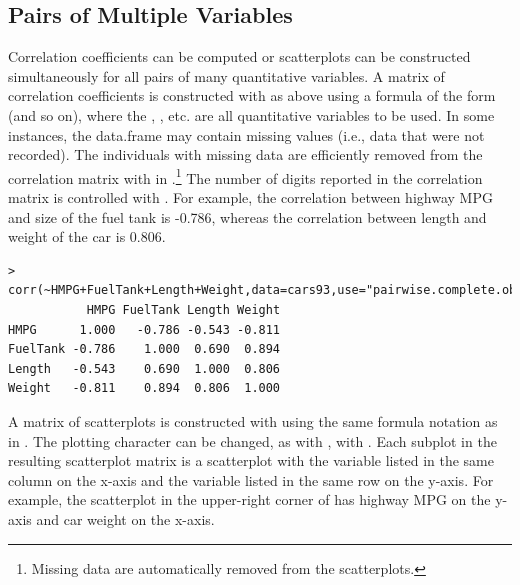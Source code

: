 \documentclass[10pt,openany]{book}\usepackage[]{graphicx}\usepackage[]{color}
\makeatletter
\newenvironment{kframe}{%
 \def\at@end@of@kframe{}%
 \ifinner\ifhmode%
  \def\at@end@of@kframe{\end{minipage}}%
  \begin{minipage}{\columnwidth}%
 \fi\fi%
 \def\FrameCommand##1{\hskip\@totalleftmargin \hskip-\fboxsep
 \colorbox{shadecolor}{##1}\hskip-\fboxsep
     \hskip-\linewidth \hskip-\@totalleftmargin \hskip\columnwidth}%
 \MakeFramed {\advance\hsize-\width
   \@totalleftmargin\z@ \linewidth\hsize
   \@setminipage}}%
 {\par\unskip\endMakeFramed%
 \at@end@of@kframe}
\newenvironment{knitrout}{}{} %
\makeatother
\begin{document}
\subsection{Pairs of Multiple Variables}
\vspace{-3pt}

Correlation coefficients can be computed or scatterplots can be constructed simultaneously for all pairs of many quantitative variables. A matrix of correlation coefficients is constructed with  as above using a formula of the form  (and so on), where the , , etc. are all quantitative variables to be used. In some instances, the data.frame may contain missing values (i.e., data that were not recorded). The individuals with missing data are efficiently removed from the correlation matrix with  in .\footnote{Missing data are automatically removed from the scatterplots.} The number of digits reported in the correlation matrix is controlled with . For example, the correlation between highway MPG and size of the fuel tank is -0.786, whereas the correlation between length and weight of the car is 0.806.
\begin{knitrout}
\color{fgcolor}\begin{kframe}
\begin{verbatim}
> corr(~HMPG+FuelTank+Length+Weight,data=cars93,use="pairwise.complete.obs",digits=3)
           HMPG FuelTank Length Weight
HMPG      1.000   -0.786 -0.543 -0.811
FuelTank -0.786    1.000  0.690  0.894
Length   -0.543    0.690  1.000  0.806
Weight   -0.811    0.894  0.806  1.000
\end{verbatim}
\end{kframe}
\end{knitrout}

A matrix of scatterplots is constructed with  using the same formula notation as in . The plotting character can be changed, as with , with . Each subplot in the resulting scatterplot matrix  is a scatterplot with the variable listed in the same column on the x-axis and the variable listed in the same row on the y-axis. For example, the scatterplot in the upper-right corner of  has highway MPG on the y-axis and car weight on the x-axis.
\end{document}

